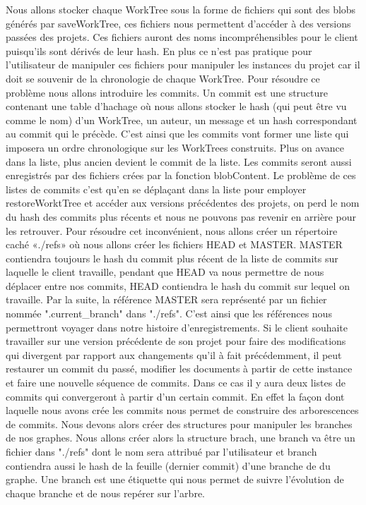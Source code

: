 \documentclass[12pt,francais]{article}
\begin{document}
	Nous allons stocker chaque WorkTree sous la forme de fichiers qui sont des blobs générés par saveWorkTree, ces fichiers nous permettent d’accéder à des versions passées des projets. Ces fichiers auront des noms incompréhensibles pour le client puisqu’ils sont dérivés de leur hash. En plus ce n’est pas pratique pour l’utilisateur de manipuler ces fichiers pour manipuler les instances du projet car il doit se souvenir de la chronologie de chaque WorkTree. \newline
	Pour résoudre ce problème nous allons introduire les commits. Un commit est une structure contenant une table d’hachage où nous allons stocker le hash (qui peut être vu comme le nom) d’un WorkTree, un auteur, un message et un hash correspondant au commit qui le précède. C’est ainsi que les commits vont former une liste qui imposera un ordre chronologique sur les WorkTrees construits. Plus on avance dans la liste, plus ancien devient le commit de la liste. Les commits seront aussi enregistrés par des fichiers crées par la fonction blobContent. \newline
	Le problème de ces listes de commits c’est qu’en se déplaçant dans la liste pour employer restoreWorktTree et accéder aux versions précédentes des projets, on perd le nom du hash des commits plus récents et nous ne pouvons pas revenir en arrière pour les retrouver. Pour résoudre cet inconvénient, nous allons créer un répertoire caché «./refs» où nous allons créer les fichiers HEAD et MASTER. MASTER contiendra toujours le hash du commit plus récent de la liste de commits sur laquelle le client travaille, pendant que HEAD va nous permettre de nous déplacer entre nos commits, HEAD contiendra le hash du commit sur lequel on travaille. Par la suite, la référence MASTER sera représenté par un fichier nommée ".current\_branch" dans "./refs". \newline \newline
	C’est ainsi que les références nous permettront voyager dans notre histoire d’enregistrements.  Si le client souhaite travailler sur une version précédente de son projet pour faire des modifications qui divergent par rapport aux changements qu’il à fait précédemment, il peut restaurer un commit du passé, modifier les documents à partir de cette instance et faire une nouvelle séquence de commits. Dans ce cas il y aura deux listes de commits qui convergeront à partir d’un certain commit. En effet la façon dont laquelle nous avons crée les commits nous permet de construire des arborescences de commits. Nous devons alors créer des structures pour manipuler les branches de nos graphes. Nous allons créer alors la structure brach, une branch va être un fichier dans "./refs" dont le nom sera attribué par l’utilisateur et branch contiendra  aussi le hash de la feuille (dernier commit) d’une branche de du graphe. Une branch est une étiquette qui nous permet de suivre l’évolution de chaque branche et de nous repérer sur l'arbre.
\end{document}
